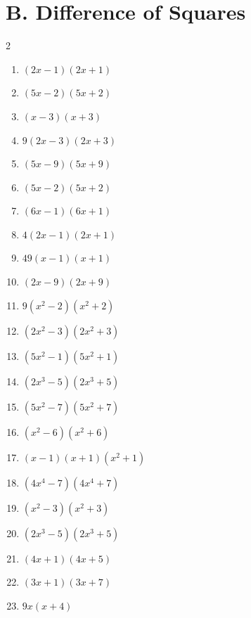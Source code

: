 \documentclass[11pt,oneside]{book}
\begin{document}
\section*{B. Difference of Squares}
\begin{multicols}{2}
\begin{enumerate}[leftmargin=*,label=\textbf{B\arabic*.},itemsep=0.45\baselineskip]
\item $ \left(2 x - 1\right) \left(2 x + 1\right) $
\item $ \left(5 x - 2\right) \left(5 x + 2\right) $
\item $ \left(x - 3\right) \left(x + 3\right) $
\item $ 9 \left(2 x - 3\right) \left(2 x + 3\right) $
\item $ \left(5 x - 9\right) \left(5 x + 9\right) $
\item $ \left(5 x - 2\right) \left(5 x + 2\right) $
\item $ \left(6 x - 1\right) \left(6 x + 1\right) $
\item $ 4 \left(2 x - 1\right) \left(2 x + 1\right) $
\item $ 49 \left(x - 1\right) \left(x + 1\right) $
\item $ \left(2 x - 9\right) \left(2 x + 9\right) $
\item $ 9 \left(x^{2} - 2\right) \left(x^{2} + 2\right) $
\item $ \left(2 x^{2} - 3\right) \left(2 x^{2} + 3\right) $
\item $ \left(5 x^{2} - 1\right) \left(5 x^{2} + 1\right) $
\item $ \left(2 x^{3} - 5\right) \left(2 x^{3} + 5\right) $
\item $ \left(5 x^{2} - 7\right) \left(5 x^{2} + 7\right) $
\item $ \left(x^{2} - 6\right) \left(x^{2} + 6\right) $
\item $ \left(x - 1\right) \left(x + 1\right) \left(x^{2} + 1\right) $
\item $ \left(4 x^{4} - 7\right) \left(4 x^{4} + 7\right) $
\item $ \left(x^{2} - 3\right) \left(x^{2} + 3\right) $
\item $ \left(2 x^{3} - 5\right) \left(2 x^{3} + 5\right) $
\item $ \left(4 x + 1\right) \left(4 x + 5\right) $
\item $ \left(3 x + 1\right) \left(3 x + 7\right) $
\item $ 9 x \left(x + 4\right) $

\end{enumerate}
\end{multicols}
\end{document}
